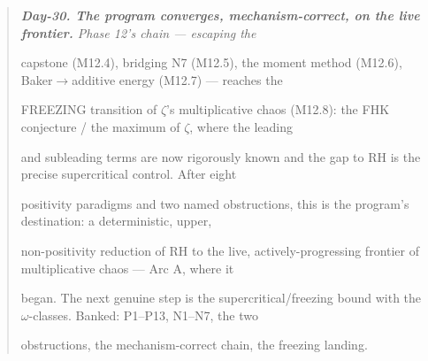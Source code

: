 \documentclass[10pt]{article}
\begin{document}
\begin{quote}\itshape
\textbf{Day-30. The program converges, mechanism-correct, on the live frontier.} Phase 12's chain --- escaping the\par
capstone (M12.4), bridging N7 (M12.5), the moment method (M12.6), Baker\ensuremath{\to}additive energy (M12.7) --- reaches the\par
FREEZING transition of \ensuremath{\zeta}'s multiplicative chaos (M12.8): the FHK conjecture / the maximum of \ensuremath{\zeta}, where the leading\par
and subleading terms are now rigorously known and the gap to RH is the precise supercritical control. After eight\par
positivity paradigms and two named obstructions, this is the program's destination: a deterministic, upper,\par
non-positivity reduction of RH to the live, actively-progressing frontier of multiplicative chaos --- Arc A, where it\par
began. The next genuine step is the supercritical/freezing bound with the \ensuremath{\omega}-classes. Banked: P1--P13, N1--N7, the two\par
obstructions, the mechanism-correct chain, the freezing landing.\par
\end{quote}
\end{document}
